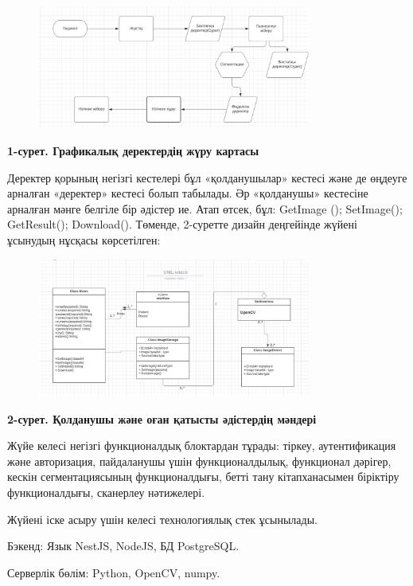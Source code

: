 \begin{figure}[H]
	\centering
	\includegraphics[width=0.8\textwidth]{assets/191}
	\caption*{}
\end{figure}

{\bfseries 1-сурет. Графикалық деректердің жүру картасы}

Деректер қорының негізгі кестелері бұл «қолданушылар» кестесі және де
өңдеуге арналған «деректер» кестесі болып табылады. Әр «қолданушы»
кестесіне арналған мәнге белгіле бір әдістер ие. Атап өтсек, бұл:
GetImage (); SetImage(); GetResult(); Download(). Төменде, 2-суретте
дизайн деңгейінде жүйені ұсынудың нұсқасы көрсетілген:

\begin{figure}[H]
	\centering
	\includegraphics[width=0.8\textwidth]{assets/192}
	\caption*{}
\end{figure}

{\bfseries 2-сурет. Қолданушы және оған қатысты әдістердің мәндері}

Жүйе келесі негізгі функционалдық блоктардан тұрады: тіркеу,
аутентификация және авторизация, пайдаланушы үшін функционалдылық,
функционал дәрігер, кескін сегментациясының функционалдығы, бетті тану
кітапханасымен біріктіру функционалдығы, сканерлеу нәтижелері.

Жүйені іске асыру үшін келесі технологиялық стек ұсынылады.

Бэкенд: Язык NestJS, NodeJS, БД PostgreSQL.

Серверлік бөлім: Python, OpenCV, numpy.

